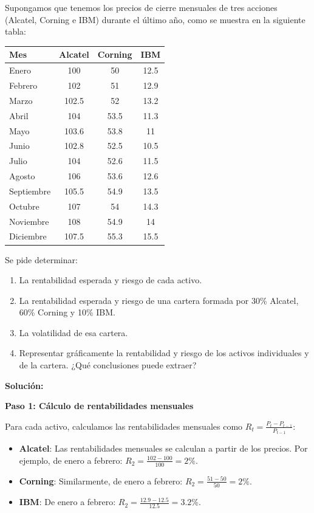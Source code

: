 \begin{ejemplo}
Supongamos que tenemos los precios de cierre mensuales de tres acciones (Alcatel, Corning e IBM) durante el último año, como se muestra en la siguiente tabla:

\begin{center}
\begin{tabular}{lccc}
\toprule
Mes & Alcatel & Corning & IBM \\
\midrule
Enero & 100 & 50 & 12.5 \\
Febrero & 102 & 51 & 12.9 \\
Marzo & 102.5 & 52 & 13.2 \\
Abril & 104 & 53.5 & 11.3 \\
Mayo & 103.6 & 53.8 & 11 \\
Junio & 102.8 & 52.5 & 10.5 \\
Julio & 104 & 52.6 & 11.5 \\
Agosto & 106 & 53.6 & 12.6 \\
Septiembre & 105.5 & 54.9 & 13.5 \\
Octubre & 107 & 54 & 14.3 \\
Noviembre & 108 & 54.9 & 14 \\
Diciembre & 107.5 & 55.3 & 15.5 \\
\bottomrule
\end{tabular}
\end{center}

Se pide determinar:
\begin{enumerate}
\item La rentabilidad esperada y riesgo de cada activo.
\item La rentabilidad esperada y riesgo de una cartera formada por 30\% Alcatel, 60\% Corning y 10\% IBM.
\item La volatilidad de esa cartera.
\item Representar gráficamente la rentabilidad y riesgo de los activos individuales y de la cartera. ¿Qué conclusiones puede extraer?
\end{enumerate}

\textbf{Solución:}

\textbf{Paso 1: Cálculo de rentabilidades mensuales}

Para cada activo, calculamos las rentabilidades mensuales como $R_t = \frac{P_t - P_{t-1}}{P_{t-1}}$:

\begin{itemize}
\item \textbf{Alcatel}: Las rentabilidades mensuales se calculan a partir de los precios. Por ejemplo, de enero a febrero: $R_2 = \frac{102-100}{100} = 2\%$.
\item \textbf{Corning}: Similarmente, de enero a febrero: $R_2 = \frac{51-50}{50} = 2\%$.
\item \textbf{IBM}: De enero a febrero: $R_2 = \frac{12.9-12.5}{12.5} = 3.2\%$.
\end{itemize}


\end{ejemplo}
